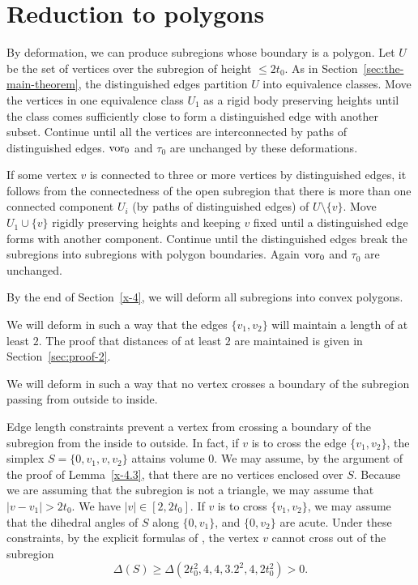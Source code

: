 \section{Reduction to polygons}

By deformation, we can produce subregions whose boundary is a polygon.
Let $U$ be the set of vertices over the subregion of height $\le2t_0$.
As in Section~\ref{sec:the-main-theorem}, the distinguished edges
partition $U$ into equivalence classes.  Move the vertices in one
equivalence class $U_1$ as a rigid body preserving heights until the
class comes sufficiently close to form a distinguished edge with another
subset. Continue until all the vertices are interconnected by paths of
distinguished edges. $\operatorname{vor}_0$ and $\tau_0$ are unchanged by these
deformations.

If some vertex $v$ is connected to three or more vertices by
distinguished edges, it follows from the connectedness of the open
subregion that there is more than one connected component $U_i$ (by
paths of distinguished edges) of $U\setminus\{v\}$. Move $U_1\cup \{v\}$
rigidly preserving heights and keeping $v$ fixed until a distinguished
edge forms with another component. Continue until the distinguished
edges break the subregions into subregions with polygon boundaries.
Again $\operatorname{vor}_0$ and $\tau_0$ are unchanged.

By the end of Section~\ref{x-4}, we will deform all subregions into
convex polygons.

\begin{remark}
    \label{remark:proof-2}
We will deform in such a way that the edges $\{v_1,v_2\}$ will maintain a
length of at least $2$. The proof that distances of at least $2$ are
maintained is given in Section~\ref{sec:proof-2}.

We will deform in such a way that no vertex  crosses a boundary of the
subregion passing from outside to inside.
\end{remark}

Edge length constraints prevent a vertex from crossing a boundary of the
subregion from the inside to outside.  In fact, if $v$ is to cross the
edge $\{v_1,v_2\}$, the simplex $S=\{0,v_1,v,v_2\}$ attains volume 0.  We
may assume, by the argument of the proof of Lemma~\ref{x-4.3}, that
there are no vertices enclosed over $S$. Because we are assuming that
the subregion is not a triangle, we may assume that $|v-v_1|>2t_0$. We
have $|v|\in[2,2t_0]$.  If $v$ is to cross $\{v_1,v_2\}$, we may assume
that the dihedral angles of $S$ along $\{0,v_1\}$, and $\{0,v_2\}$ are
acute. Under these constraints, by the explicit formulas of
\cite[Sec.~8]{part1}, the vertex $v$ cannot cross out of the subregion
    \begin{equation}
    \Delta(S)\ge \Delta(2t_0^2,4,4,3.2^2,4,2t_0^2)>0.
    \label{eqn:D>0}
    \end{equation}

